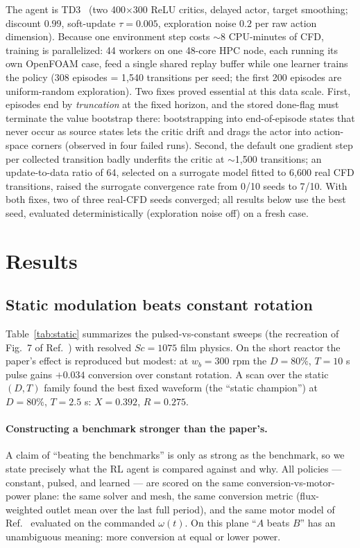 \documentclass{article}
\begin{document}
The agent is TD3~\cite{fujimoto2018addressing} (two 400$\times$300 ReLU
critics, delayed actor, target smoothing; discount $0.99$, soft-update
$\tau = 0.005$, exploration noise $0.2$ per raw action dimension). Because one
environment step costs $\sim$8 CPU-minutes of CFD, training is parallelized:
44 workers on one 48-core HPC node, each running its own OpenFOAM case,
feed a single shared replay buffer while one learner trains the policy
(308 episodes = 1{,}540 transitions per seed; the first 200 episodes are
uniform-random exploration). Two fixes proved essential at this data scale.
First, episodes end by \emph{truncation} at the fixed horizon, and the stored
done-flag must terminate the value bootstrap there: bootstrapping into
end-of-episode states that never occur as source states lets the critic drift
and drags the actor into action-space corners (observed in four failed runs).
Second, the default one gradient step per collected transition badly underfits
the critic at $\sim$1{,}500 transitions; an update-to-data ratio of 64,
selected on a surrogate model fitted to 6{,}600 real CFD transitions,
raised the surrogate convergence rate from 0/10 seeds to 7/10. With both fixes,
two of three real-CFD seeds converged; all results below use the best seed,
evaluated deterministically (exploration noise off) on a fresh case.

\section{Results}

\subsection{Static modulation beats constant rotation}
Table~\ref{tab:static} summarizes the pulsed-vs-constant sweeps
(the recreation of Fig.~7 of Ref.~\cite{lopez2024process}) with resolved
$Sc = 1075$ film physics. On the short reactor the paper's effect is
reproduced but modest: at $w_b = 300$ rpm the $D = 80\%$, $T = 10$ s pulse
gains $+0.034$ conversion over constant rotation. A scan over the static
$(D, T)$ family found the best fixed waveform (the ``static champion'') at
$D = 80\%$, $T = 2.5$ s: $X = 0.392$, $R = 0.275$.

\paragraph{Constructing a benchmark stronger than the paper's.}
A claim of ``beating the benchmarks'' is only as strong as the benchmark, so
we state precisely what the RL agent is compared against and why. All policies
--- constant, pulsed, and learned --- are scored on the same
conversion-vs-motor-power plane: the same solver and mesh, the same conversion
metric (flux-weighted outlet mean over the last full period), and the same
motor model of Ref.~\cite{lopez2024process} evaluated on the commanded
$\omega(t)$. On this plane ``$A$ beats $B$'' has an unambiguous meaning: more
conversion at equal or lower power.
\end{document}
